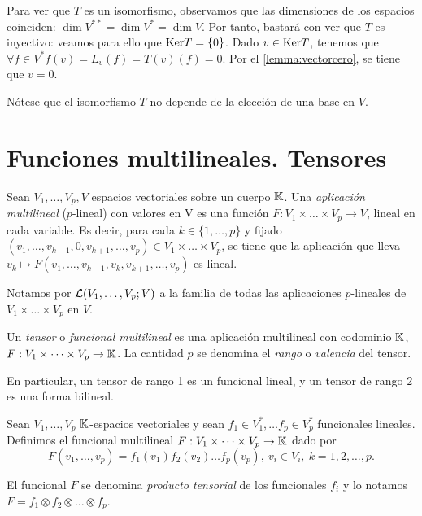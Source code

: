 Para ver que \(T\) es un isomorfismo, observamos que las dimensiones de
los espacios coinciden: \(\dim V^{**}=\dim V^{*}=\dim V\). Por tanto,
bastará con ver que \(T\) es inyectivo: veamos para ello que
\(\mathrm{Ker} T=\{0\}\). Dado \(v\in \mathrm{Ker} T\), tenemos que
\(\forall f\in V^{*} f(v)=L_v(f)=T(v)(f)=0\). Por el
\autoref{lemma:vectorcero}, se tiene que \(v=0\).

Nótese que el isomorfismo \(T\) no depende de la elección de una base en
\(V\).

\section{Funciones multilineales.
Tensores}\label{funciones-multilineales.-tensores}


Sean \(V_1,\dots,V_p,V\) espacios vectoriales sobre un cuerpo \(\mathbb{K}\).
Una \emph{aplicación multilineal} (\(p\)-lineal) con valores en V es una
función \(F:V_1\times \dots\times V_p\rightarrow V\), lineal en cada
variable. Es decir, para cada \(k\in \{1,\dots, p\}\) y fijado
\((v_1,\dots,v_{k-1},0,v_{k+1},\dots,v_p)\in V_1\times \dots\times V_p\),
se tiene que la aplicación que lleva
\(v_k\mapsto F(v_1,\dots,v_{k-1},v_k,v_{k+1},\dots,v_p)\) es lineal.

Notamos por \(\mathcal{L}(V_1,\dots,V_p;V)\) a la familia de todas las
aplicaciones \(p\)-lineales de \(V_1\times \dots\times V_p\) en \(V\).



Un \emph{tensor} o \emph{funcional multilineal} es una aplicación
multilineal con codominio \(\mathbb{K}\),
\(F:V_1\times \dots\times V_p\rightarrow \mathbb{K}\). La cantidad \(p\) se
denomina el \emph{rango} o \emph{valencia} del tensor.


En particular, un tensor de rango 1 es un funcional lineal, y un
tensor de rango 2 es una forma bilineal.

\exampleb

Sean \(V_1,\dots,V_p\) \(\mathbb{K}\)-espacios vectoriales y sean
\(f_1\in V_1^{*},\dots f_p\in V_p^{*}\) funcionales lineales. Definimos
el funcional multilineal \(F:V_1\times\dots\times V_p\rightarrow\mathbb{K}\)
dado por
\[F(v_1,\dots,v_p)=f_1(v_1)f_2(v_2)\dots f_p(v_p),\ v_i\in V_i,\ k=1,2,\dots,p.\]

El funcional \(F\) se denomina \emph{producto tensorial} de los
funcionales \(f_i\) y lo notamos
\(F=f_1\otimes f_2\otimes\dots\otimes f_p\).

